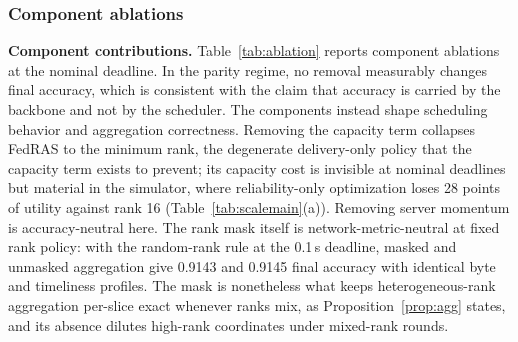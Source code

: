 \documentclass[a4paper,fleqn]{cas-dc}
\begin{document}
\begin{table}[pos=tbp]
\centering\footnotesize
\caption{Scheduling arms in the real trainer (1.0\,MB budget; the FedLoRA $r{=}16$ reference is in Table~\ref{tab:ladder}). Nominal: ten seeds; stress 0.1\,s: five seeds.}
\label{tab:arms}
\end{table}


\subsubsection{Component ablations}
\textbf{Component contributions.} Table~\ref{tab:ablation} reports component ablations at the nominal deadline. In the parity regime, no removal measurably changes final accuracy, which is consistent with the claim that accuracy is carried by the backbone and not by the scheduler. The components instead shape scheduling behavior and aggregation correctness. Removing the capacity term collapses FedRAS to the minimum rank, the degenerate delivery-only policy that the capacity term exists to prevent; its capacity cost is invisible at nominal deadlines but material in the simulator, where reliability-only optimization loses 28 points of utility against rank 16 (Table~\ref{tab:scalemain}(a)). Removing server momentum is accuracy-neutral here. The rank mask itself is network-metric-neutral at fixed rank policy: with the random-rank rule at the 0.1\,s deadline, masked and unmasked aggregation give 0.9143 and 0.9145 final accuracy with identical byte and timeliness profiles. The mask is nonetheless what keeps heterogeneous-rank aggregation per-slice exact whenever ranks mix, as Proposition~\ref{prop:agg} states, and its absence dilutes high-rank coordinates under mixed-rank rounds.
\end{document}
